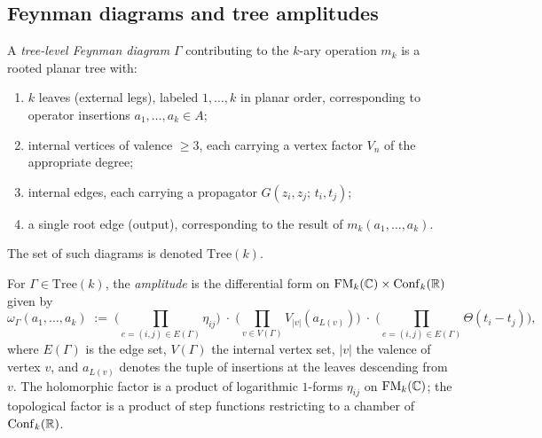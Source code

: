 \subsection{Feynman diagrams and tree amplitudes}

\begin{definition}
A \emph{tree-level Feynman diagram} $\Gamma$ contributing to the
$k$-ary operation $m_k$ is a rooted planar tree with:
\begin{enumerate}[label=(\roman*)]
\item $k$ leaves (external legs), labeled $1, \ldots, k$ in planar
 order, corresponding to operator insertions
 $a_1, \ldots, a_k \in A$;
\item internal vertices of valence $\ge 3$, each carrying a vertex
 factor $V_n$ of the appropriate degree;
\item internal edges, each carrying a propagator
 $G(z_i, z_j;\, t_i, t_j)$;
\item a single root edge (output), corresponding to the result
 of $m_k(a_1, \ldots, a_k)$.
\end{enumerate}
The set of such diagrams is denoted $\mathrm{Tree}(k)$.
\end{definition}

\begin{definition}
\label{def:thqg-bv-ext-tree-amplitude}
For $\Gamma \in \mathrm{Tree}(k)$, the \emph{amplitude} is the
differential form on $\operatorname{FM}_k(\mathbb{C}) \times \operatorname{Conf}_k(\mathbb{R})$ given by
\begin{equation}
\omega_\Gamma(a_1, \ldots, a_k)
\;:=\;
\biggl(\prod_{e = (i,j) \in E(\Gamma)}
\eta_{ij}\biggr)
\;\cdot\;
\biggl(\prod_{v \in V(\Gamma)} V_{|v|}(a_{L(v)})\biggr)
\;\cdot\;
\biggl(\prod_{e = (i,j) \in E(\Gamma)}
\Theta(t_i - t_j)\biggr),
\end{equation}
where $E(\Gamma)$ is the edge set, $V(\Gamma)$ the internal vertex
set, $|v|$ the valence of vertex $v$, and $a_{L(v)}$ denotes the
tuple of insertions at the leaves descending from $v$. The
holomorphic factor is a product of logarithmic $1$-forms $\eta_{ij}$
on $\operatorname{FM}_k(\mathbb{C})$; the topological factor is a product of step
functions restricting to a chamber of $\operatorname{Conf}_k(\mathbb{R})$.
\end{definition}


